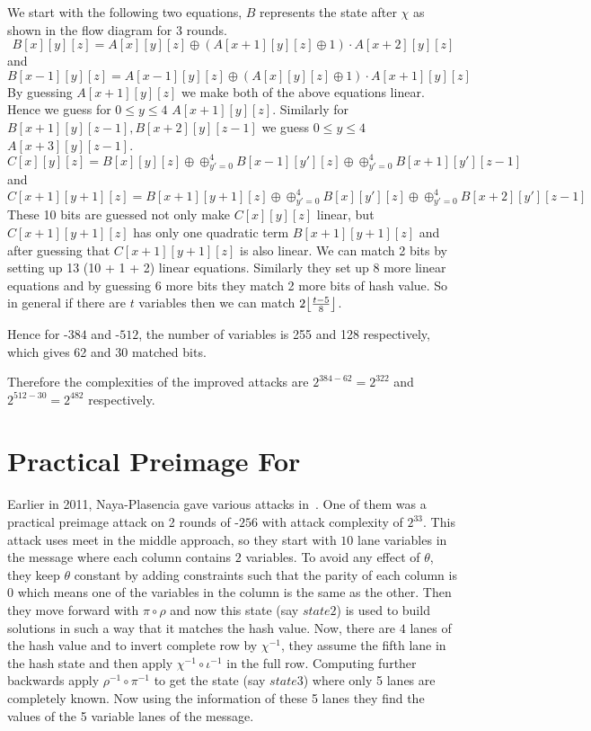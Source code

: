         We start with the following two equations, $B$ represents the state after $\chi$ as shown in the flow diagram for 3 rounds.
        \[
            B[x][y][z] = A[x][y][z] \oplus (A[x+1][y][z] \oplus 1) \cdot A[x+2][y][z]
        \] and
        \[
            B[x-1][y][z] = A[x-1][y][z] \oplus (A[x][y][z] \oplus 1) \cdot A[x+1][y][z]
        \]
        By guessing $A[x+1][y][z]$ we make both of the above equations linear. Hence we guess for $0 \leq y \leq 4$ $A[x+1][y][z]$. Similarly for $B[x+1][y][z-1], B[x+2][y][z-1]$ we guess $0 \leq y \leq 4$ $A[x+3][y][z-1]$.
        \[
        C[x][y][z] = B[x][y][z] \oplus \oplus_{y' = 0}^{4} B[x-1][y'][z] \oplus \oplus_{y' = 0}^{4} B[x+1][y'][z-1]
    \] and 
        \[
        C[x+1][y+1][z] = B[x+1][y+1][z] \oplus \oplus_{y' = 0}^{4} B[x][y'][z] \oplus \oplus_{y' = 0}^{4} B[x+2][y'][z-1]
    \]
        These 10 bits are guessed not only make $C[x][y][z]$ linear, but $C[x+1][y+1][z]$ has only one quadratic term $B[x+1][y+1][z]$ and after guessing that $C[x+1][y+1][z]$ is also linear. We can match 2 bits by setting up 13 (10 + 1 + 2) linear equations. Similarly they set up 8 more linear equations and by guessing 6 more bits they match 2 more bits of hash value. So in general if there are $t$ variables then we can match $ 2\floor*{\frac{t-5}{8}}$.

        Hence for \KECCAK-$384$ and \KECCAK-$512$, the number of variables is 255 and 128 respectively, which gives 62 and 30 matched bits.
        
        Therefore the complexities of the improved attacks are $2^{384 - 62} = 2^{322}$ and $2^{512 - 30} = 2^{482}$ respectively.

\section{Practical Preimage For }

Earlier in 2011, Naya-Plasencia \etal gave various attacks in~\cite{naya2011practical}. One of them was a practical preimage attack on 2 rounds of \KECCAK-$256$ with attack complexity of $2^{33}$. This attack uses meet in the middle approach, so they start with $10$ lane variables in the message where each column contains $2$ variables. To avoid any effect of $\theta$, they keep $\theta$ constant by adding constraints such that the parity of each column is $0$ which means one of the variables in the column is the same as the other. Then they move forward with $\pi \circ \rho$ and now this state (say $state2$) is used to build solutions in such a way that it matches the hash value. Now, there are $4$ lanes of the hash value and to invert complete row by $\chi^{-1}$, they assume the fifth lane in the hash state and then apply $\chi^{-1} \circ \iota^{-1}$ in the full row. Computing further backwards apply $\rho^{-1} \circ \pi^{-1}$ to get the state (say $state3$) where only 5 lanes are completely known. Now using the information of these 5 lanes they find the values of the 5 variable lanes of the message.

